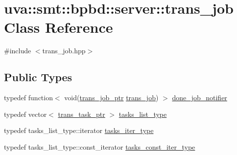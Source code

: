 \hypertarget{classuva_1_1smt_1_1bpbd_1_1server_1_1trans__job}{}\section{uva\+:\+:smt\+:\+:bpbd\+:\+:server\+:\+:trans\+\_\+job Class Reference}
\label{classuva_1_1smt_1_1bpbd_1_1server_1_1trans__job}


{\ttfamily \#include $<$trans\+\_\+job.\+hpp$>$}

\subsection*{Public Types}
\begin{DoxyCompactItemize}
\item 
typedef function$<$ void(\hyperlink{namespaceuva_1_1smt_1_1bpbd_1_1server_acb76132c82e66b5dbf7e3aa0e5af2580}{trans\+\_\+job\+\_\+ptr} \hyperlink{classuva_1_1smt_1_1bpbd_1_1server_1_1trans__job}{trans\+\_\+job}) $>$ \hyperlink{classuva_1_1smt_1_1bpbd_1_1server_1_1trans__job_ad136e2791c7f5259a4e0974db72e7178}{done\+\_\+job\+\_\+notifier}
\item 
typedef vector$<$ \hyperlink{namespaceuva_1_1smt_1_1bpbd_1_1server_a4dea4bb1185fe5d148be18ad12fea74a}{trans\+\_\+task\+\_\+ptr} $>$ \hyperlink{classuva_1_1smt_1_1bpbd_1_1server_1_1trans__job_a8d6020c8c7d17ba4bbb71fd85df6791d}{tasks\+\_\+list\+\_\+type}
\item 
typedef tasks\+\_\+list\+\_\+type\+::iterator \hyperlink{classuva_1_1smt_1_1bpbd_1_1server_1_1trans__job_a3e7878af85efafacb0af16bf5a13bb4a}{tasks\+\_\+iter\+\_\+type}
\item 
typedef tasks\+\_\+list\+\_\+type\+::const\+\_\+iterator \hyperlink{classuva_1_1smt_1_1bpbd_1_1server_1_1trans__job_ac1153b7924858b7cd9d7cb30d7586206}{tasks\+\_\+const\+\_\+iter\+\_\+type}
\end{DoxyCompactItemize}
